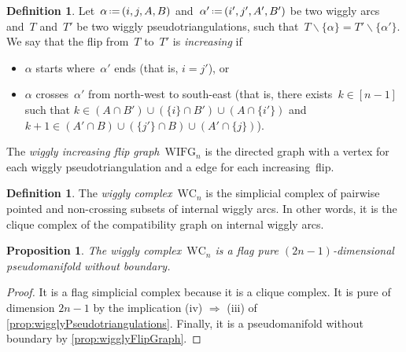 \documentclass{amsart}
\newtheorem{proposition}[theorem]{Proposition}
\theoremstyle{definition}
\newtheorem{definition}[theorem]{Definition}
\newcommand{\ssm}{\smallsetminus} %
\newcommand{\eqdef}{\mbox{\,\raisebox{0.2ex}{\scriptsize\ensuremath{\mathrm:}}\ensuremath{=}\,}} %
\newcommand{\darkblue}{\color{darkblue}} %
\newcommand{\defn}[1]{\textsl{\darkblue #1}} %
\newcommand{\wigglyComplex}{\mathrm{WC}} %
\newcommand{\wigglyIncreasingFlipGraph}{\mathrm{WIFG}} %
\begin{document}
\begin{definition}
\label{def:wigglyIncreasingFlipGraph}
Let~$\alpha \eqdef (i, j, A, B)$ and~$\alpha' \eqdef (i', j', A', B')$ be two wiggly arcs and~$T$ and~$T'$ be two wiggly pseudotriangulations, such that~$T \ssm \{\alpha\} = T' \ssm \{\alpha'\}$.
We say that the flip from~$T$ to~$T'$ is \defn{increasing} if 
\begin{itemize}
\item $\alpha$ starts where~$\alpha'$ ends (that is, $i = j'$), or 
\item $\alpha$ crosses~$\alpha'$ from north-west to south-east (that is, there exists~$k \in [n-1]$ such that $k \in (A \cap B') \cup (\{i\} \cap B') \cup (A \cap \{i'\})$ and~$k+1 \in (A' \cap B) \cup (\{j'\} \cap B) \cup (A' \cap \{j\})$).
\end{itemize}
The \defn{wiggly increasing flip graph}~$\wigglyIncreasingFlipGraph_n$ is the directed graph with a vertex for each wiggly pseudotriangulation and a edge for each increasing~flip.
\end{definition}

\begin{definition}
The \defn{wiggly complex}~$\wigglyComplex_n$ is the simplicial complex of pairwise pointed and non-crossing subsets of internal wiggly arcs.
In other words, it is the clique complex of the compatibility graph on internal wiggly arcs.
\end{definition}

\begin{proposition}
The wiggly complex~$\wigglyComplex_n$ is a flag pure $(2n-1)$-dimensional pseudomanifold without boundary.
\end{proposition}

\begin{proof}
It is a flag simplicial complex because it is a clique complex.
It is pure of dimension $2n-1$ by the implication (iv) $\Rightarrow$ (iii) of \cref{prop:wigglyPseudotriangulations}.
Finally, it is a pseudomanifold without boundary by \cref{prop:wigglyFlipGraph}.
\end{proof}
\end{document}

